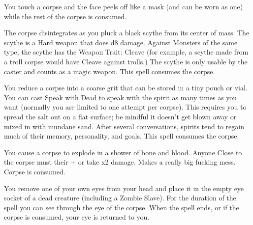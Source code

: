 {\NECRO[
  Name=Death Mask,
  Link=necromancy-death-mask,
  Paradigm=Death,
  Save=N,
  Duration=Permanent,
  Mod=+9,
  Keywords=None,
  Target=Close (touch) corpse
]


You touch a corpse and the face peels off like a mask (and can be worn as one) while the rest of the corpse is consumed.

\NECRO[
  Name=Death Scythe,
  Link=necromancy-death-scythe
  Paradigm=Death,
  Save=N,
  Duration=Combat or \LVL Minutes,
  Mod=+3,
  Keywords=None,
  Target=Close (touch) corpse
]


The corpse disintegrates as you pluck a black scythe from its center of mass. The scythe is a Hard weapon that does d8 damage.  Against Monsters of the same type, the scythe has the Weapon Trait: Cleave (for example, a scythe made from a troll corpse would have Cleave against trolls.) The scythe is only usable by the caster and counts as a magic weapon. This spell consumes the corpse.

\NECRO[
  Name=Essential Salt,
  Link=necromancy-essential-salt,
  Paradigm=Death,
  Save=N,
  Duration=Permanent,
  Mod=+9,
  Keywords=None,
  Target=Close (touch) corpse
]


You reduce a corpse into a coarse grit that can be stored in a tiny pouch or vial. You can cast Speak with Dead to speak with the spirit as many times as you want (normally you are limited to one attempt per corpse). This requires you to spread the salt out on a flat surface; be mindful it doesn't get blown away or mixed in with mundane sand. After several conversations, spirits tend to regain much of their memory, personality, and goals. This spell consumes the corpse.

\NECRO[
  Name=Exploding Corpse,
  Link=necromancy-exploding-corpse,
  Paradigm=Death,
  Save=N,
  Duration=0,
  Mod=+9,
  Keywords=None,
  Target=Nearby Corpse
]

You cause a corpse to explode in a shower of bone and blood. Anyone Close to the corpse must \RO their \MD + \DEX or take \LVL x2 damage.  Makes a really big fucking mess.  Corpse is consumed.

\NECRO[
  Name=Eyes of the Dead,
  Link=necromancy-eyes-of-the-dead,
  Paradigm=Death,
  Save=N,
  Duration=Session,
  Mod=+9,
  Keywords=None,
  Target=Close (touch) corpse
]


You remove one of your own eyes from your head and place it in the empty eye socket of a dead creature (including a Zombie Slave). For the duration of the spell you can see through the eye of the corpse.  When the spell ends, or if the corpse is consumed, your eye is returned to you.

}
